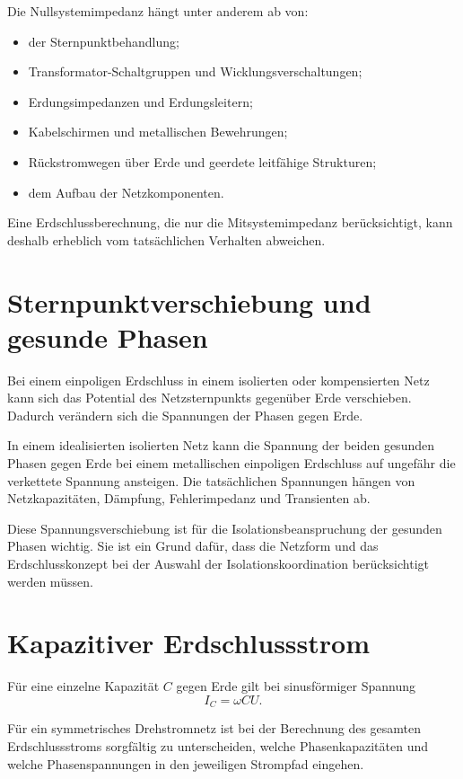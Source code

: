Die Nullsystemimpedanz hängt unter anderem ab von:
\begin{itemize}
  \item der Sternpunktbehandlung;
  \item Transformator-Schaltgruppen und Wicklungsverschaltungen;
  \item Erdungsimpedanzen und Erdungsleitern;
  \item Kabelschirmen und metallischen Bewehrungen;
  \item Rückstromwegen über Erde und geerdete leitfähige Strukturen;
  \item dem Aufbau der Netzkomponenten.
\end{itemize}

Eine Erdschlussberechnung, die nur die Mitsystemimpedanz berücksichtigt,
kann deshalb erheblich vom tatsächlichen Verhalten abweichen.

\section{Sternpunktverschiebung und gesunde Phasen}

Bei einem einpoligen Erdschluss in einem isolierten oder kompensierten Netz
kann sich das Potential des Netzsternpunkts gegenüber Erde verschieben.
Dadurch verändern sich die Spannungen der Phasen gegen Erde.

In einem idealisierten isolierten Netz kann die Spannung der beiden
gesunden Phasen gegen Erde bei einem metallischen einpoligen Erdschluss
auf ungefähr die verkettete Spannung ansteigen. Die tatsächlichen
Spannungen hängen von Netzkapazitäten, Dämpfung, Fehlerimpedanz und
Transienten ab.

Diese Spannungsverschiebung ist für die Isolationsbeanspruchung der
gesunden Phasen wichtig. Sie ist ein Grund dafür, dass die Netzform und
das Erdschlusskonzept bei der Auswahl der Isolationskoordination
berücksichtigt werden müssen.

\section{Kapazitiver Erdschlussstrom}

Für eine einzelne Kapazität \(C\) gegen Erde gilt bei sinusförmiger Spannung
\[
  I_C=\omega C U.
\]

Für ein symmetrisches Drehstromnetz ist bei der Berechnung des gesamten
Erdschlussstroms sorgfältig zu unterscheiden, welche Phasenkapazitäten
und welche Phasenspannungen in den jeweiligen Strompfad eingehen.

